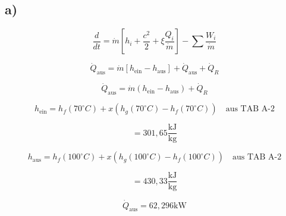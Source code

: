 

\subsection*{a)}

\[
\frac{d}{dt} = \dot{m} \left[ h_i + \frac{c^2}{2} + \xi \frac{Q_i}{\dot{m}} \right] - \sum \frac{W_i}{\dot{m}}
\]

\[
\dot{Q}_{\text{aus}} = \dot{m} \left[ h_{\text{ein}} - h_{\text{aus}} \right] + \dot{Q}_{\text{aus}} + \dot{Q}_R
\]

\[
\dot{Q}_{\text{aus}} = \dot{m} (h_{\text{ein}} - h_{\text{aus}}) + \dot{Q}_R
\]

\[
h_{\text{ein}} = h_f(70^\circ C) + x \left( h_g(70^\circ C) - h_f(70^\circ C) \right) \quad \text{aus TAB A-2}
\]

\[
= 301,65 \frac{\text{kJ}}{\text{kg}}
\]

\[
h_{\text{aus}} = h_f(100^\circ C) + x \left( h_g(100^\circ C) - h_f(100^\circ C) \right) \quad \text{aus TAB A-2}
\]

\[
= 430,33 \frac{\text{kJ}}{\text{kg}}
\]

\[
\dot{Q}_{\text{aus}} = 62,296 \text{kW}
\]